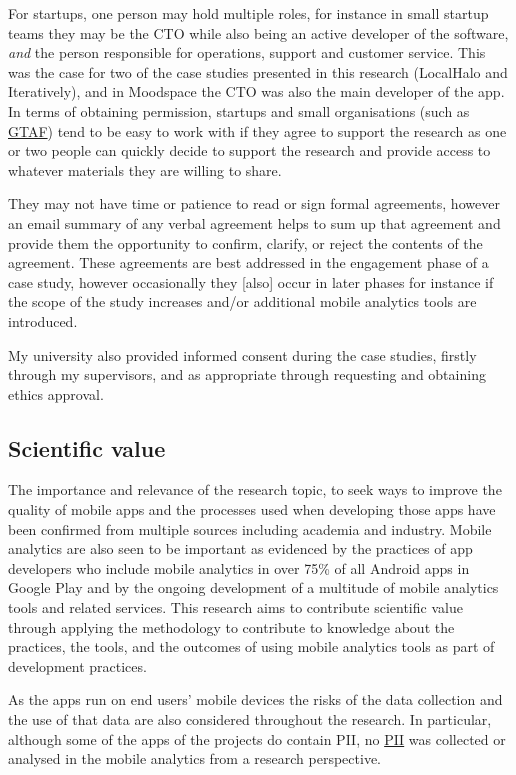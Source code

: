 For startups, one person may hold multiple roles, for instance in small startup teams they may be the CTO while also being an active developer of the software, \emph{and} the person responsible for operations, support and customer service. This was the case for two of the case studies presented in this research (LocalHalo and Iteratively), and in Moodspace the CTO was also the main developer of the app. In terms of obtaining permission, startups and small organisations (such as \href{glossary-gtaf}{GTAF}) tend to be easy to work with if they agree to support the research as one or two people can quickly decide to support the research and provide access to whatever materials they are willing to share. 

They may not have time or patience to read or sign formal agreements, however an email summary of any verbal agreement helps to sum up that agreement and provide them the opportunity to confirm, clarify, or reject the contents of the agreement. These agreements are best addressed in the engagement phase of a case study, however occasionally they [also] occur in later phases for instance if the scope of the study increases and/or additional mobile analytics tools are introduced.

My university also provided informed consent during the case studies, firstly through my supervisors, and as appropriate through requesting and obtaining ethics approval.

\subsection{Scientific value}
The importance and relevance of the research topic, to seek ways to improve the quality of mobile apps and the processes used when developing those apps have been confirmed from multiple sources including academia and industry. Mobile analytics are also seen to be important as evidenced by the practices of app developers who include mobile analytics in over 75\% of all Android apps in Google Play and by the ongoing development of a multitude of mobile analytics tools and related services. This research aims to contribute scientific value through applying the methodology to contribute to knowledge about the practices, the tools, and the outcomes of using mobile analytics tools as part of development practices. 

As the apps run on end users' mobile devices the risks of the data collection and the use of that data are also considered throughout the research. In particular, although some of the apps of the projects do contain PII, no \href{glossary-pii}{PII} was collected or analysed in the mobile analytics from a research perspective.

